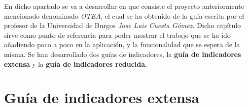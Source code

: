 
En dicho apartado se va a desarrollar en que consiste el proyecto anteriormente
mencionado denominado \textit{OTEA}, el cual se ha obtenido de la guía escrita
por el profesor de la Universidad de Burgos \textit{Jose Luis Cuesta Gómez.}\cite{gómez2009trastornos}
Dicho capítulo sirve como punto de referencia para poder mostrar el trabajo que
se ha ido añadiendo poco a poco en la aplicación, y la funcionalidad que se
espera de la misma. Se han desarrollado dos guías de indicadores, la \textbf{guía de indicadores extensa} y la \textbf{guía de indicadores reducida.}

\section{Guía de indicadores extensa}

